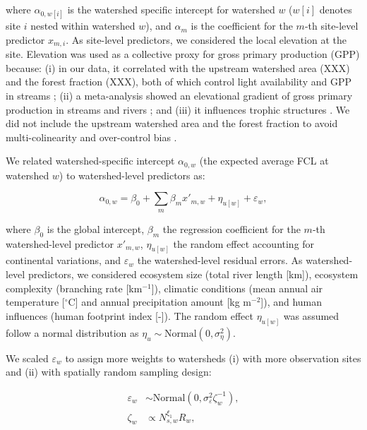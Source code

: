 \documentclass[11pt, class=article, crop=false]{standalone}
\begin{document}
where $\alpha_{0, w[i]}$ is the watershed specific intercept for watershed $w$ ($w[i]$ denotes site $i$ nested within watershed $w$), and $\alpha_m$ is the coefficient for the $m$-th site-level predictor $x_{m, i}$.
As site-level predictors, we considered the local elevation at the site. 
Elevation was used as a collective proxy for gross primary production (GPP) because: (i) in our data, it correlated with the upstream watershed area (XXX) and the forest fraction (XXX), both of which control light availability and GPP in streams \citep{finlay_light-mediated_2011, finlay_stream_2011, bernhardt_light_2022}; (ii) a meta-analysis showed an elevational gradient of gross primary production in streams and rivers \citep{marzolf_ecosystem_2021}; and (iii) it influences trophic structures \citep{oksanen_exploitation_1981}.
We did not include the upstream watershed area and the forest fraction to avoid multi-colinearity and over-control bias \citep{arif_predictive_2022}.

We related watershed-specific intercept $\alpha_{0, w}$ (the expected average FCL at watershed $w$) to watershed-level predictors as:

\begin{equation}
    \alpha_{0, w} = \beta_0 + \sum_m \beta_m x'_{m, w} + \eta_{u[w]} + \varepsilon_{w},
\end{equation}

where $\beta_0$ is the global intercept, $\beta_m$ the regression coefficient for the $m$-th watershed-level predictor $x'_{m, w}$, $\eta_{u[w]}$ the random effect accounting for continental variations, and $\varepsilon_w$ the watershed-level residual errors.
As watershed-level predictors, we considered ecosystem size (total river length [km]), ecosystem complexity (branching rate [km$^{-1}$]), climatic conditions (mean annual air temperature [$^\circ$C] and annual precipitation amount [kg m$^{-2}$]), and human influences (human footprint index [-]).
The random effect $\eta_{u[w]}$ was assumed follow a normal distribution as $\eta_{u} \sim \mbox{Normal}(0, \sigma_{\eta}^2)$.

We scaled $\varepsilon_w$ to assign more weights to watersheds (i) with more observation sites and (ii) with spatially random sampling design:

\begin{align}
    \varepsilon_w &\sim \mbox{Normal}(0, \sigma_{\varepsilon}^2 \zeta_w^{-1}),\\
    \zeta_w &\propto N_{s, w}^{\xi_1} R_w,
\end{align}
\end{document}
